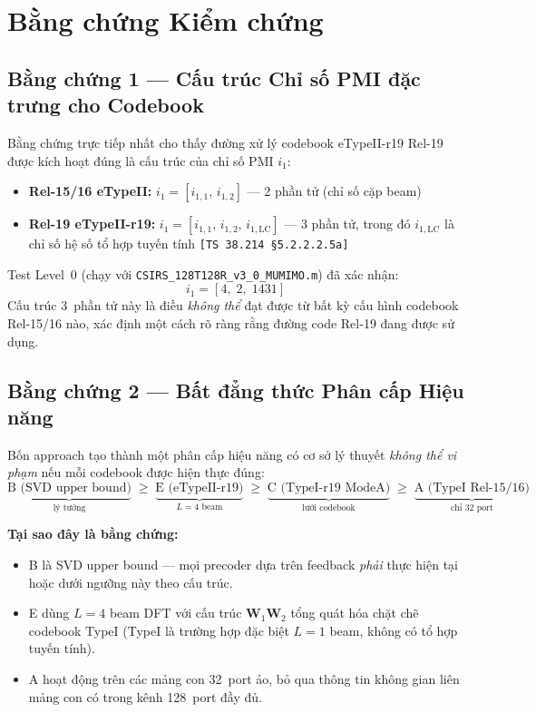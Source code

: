 \documentclass[12pt, a4paper]{article}
\newcommand{\spec}[1]{\textcolor{green!40!black}{\texttt{[#1]}}}
\newcommand{\file}[1]{\texttt{#1}}
\begin{document}
\section{Bằng chứng Kiểm chứng}

\subsection{Bằng chứng 1 --- Cấu trúc Chỉ số PMI đặc trưng cho Codebook}

Bằng chứng trực tiếp nhất cho thấy đường xử lý codebook eTypeII-r19
Rel-19 được kích hoạt đúng là cấu trúc của chỉ số PMI $i_1$:

\begin{itemize}
  \item \textbf{Rel-15/16 eTypeII:} $i_1 = [i_{1,1},\, i_{1,2}]$
        --- 2 phần tử (chỉ số cặp beam)
  \item \textbf{Rel-19 eTypeII-r19:} $i_1 = [i_{1,1},\, i_{1,2},\, i_{1,\mathrm{LC}}]$
        --- 3 phần tử, trong đó $i_{1,\mathrm{LC}}$ là chỉ số hệ số
        tổ hợp tuyến tính \spec{TS~38.214 \S5.2.2.2.5a}
\end{itemize}

Test Level~0 (chạy với \file{CSIRS\_128T128R\_v3\_0\_MUMIMO.m}) đã
xác nhận:
\[
  i_1 = [4,\; 2,\; 1431]
\]
Cấu trúc 3~phần tử này là điều \emph{không thể} đạt được từ bất kỳ
cấu hình codebook Rel-15/16 nào, xác định một cách rõ ràng rằng
đường code Rel-19 đang được sử dụng.

\subsection{Bằng chứng 2 --- Bất đẳng thức Phân cấp Hiệu năng}

Bốn approach tạo thành một phân cấp hiệu năng có cơ sở lý thuyết
\emph{không thể vi phạm} nếu mỗi codebook được hiện thực đúng:
\[
  \underbrace{\text{B (SVD upper bound)}}_{\text{lý tưởng}} \;\geq\;
  \underbrace{\text{E (eTypeII-r19)}}_{L=4\text{ beam}} \;\geq\;
  \underbrace{\text{C (TypeI-r19 ModeA)}}_{\text{lưới codebook}} \;\geq\;
  \underbrace{\text{A (TypeI Rel-15/16)}}_{\text{chỉ 32 port}}
\]

\textbf{Tại sao đây là bằng chứng:}
\begin{itemize}
  \item B là SVD upper bound --- mọi precoder dựa trên feedback
        \emph{phải} thực hiện tại hoặc dưới ngưỡng này theo cấu trúc.
  \item E dùng $L=4$ beam DFT với cấu trúc $\mathbf{W}_1\mathbf{W}_2$
        tổng quát hóa chặt chẽ codebook TypeI (TypeI là trường hợp đặc
        biệt $L=1$ beam, không có tổ hợp tuyến tính).
  \item A hoạt động trên các mảng con 32~port ảo, bỏ qua thông tin
        không gian liên mảng con có trong kênh 128~port đầy đủ.
\end{itemize}
\end{document}
